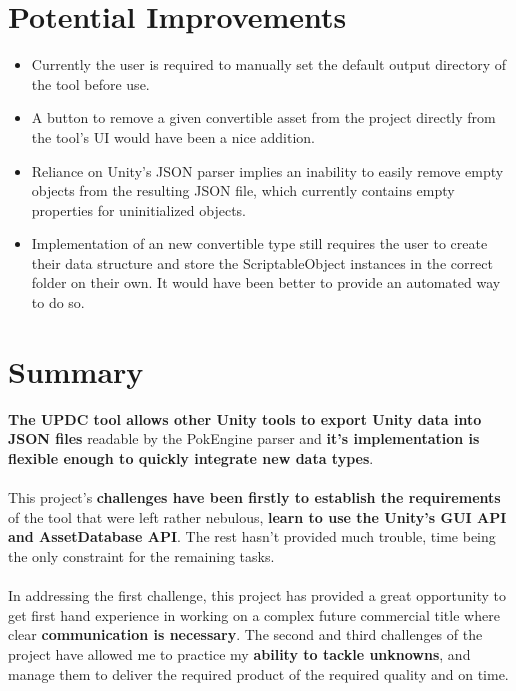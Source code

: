 \documentclass[12pt,a4paper]{article}
\begin{document}
\section{Potential Improvements}
\begin{itemize}
\item Currently the user is required to manually set the default output directory of the tool before use.
\item A button to remove a given convertible asset from the project directly from the tool's UI would have been a nice addition.
\item Reliance on Unity's JSON parser implies an inability to easily remove empty objects from the resulting JSON file, which currently contains empty properties for uninitialized objects.
\item Implementation of an new convertible type still requires the user to create their data structure and store the ScriptableObject instances in the correct folder on their own. It would have been better to provide an automated way to do so.
\end{itemize}
\newpage

\section{Summary}
\textbf{The UPDC tool allows other Unity tools to export Unity data into JSON files} readable by the PokEngine parser and \textbf{it's implementation is flexible enough to quickly integrate new data types}.\\\\
This project's \textbf{challenges have been firstly to establish the requirements} of the tool that were left rather nebulous, \textbf{learn to use the Unity's GUI API and AssetDatabase API}. The rest hasn't provided much trouble, time being the only constraint for the remaining tasks.\\\\
In addressing the first challenge, this project has provided a great opportunity to get first hand experience in working on a complex future commercial title where clear \textbf{communication is necessary}.
The second and third challenges of the project have allowed me to practice my \textbf{ability to tackle unknowns}, and manage them to deliver the required product of the required quality and on time.
\end{document}

